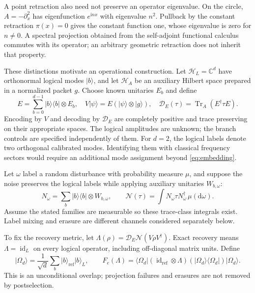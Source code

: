 \documentclass[aip,adv,reprint,onecolumn,amsmath,amssymb]{revtex4-2}
\newcommand{\C}{\mathbb C}
\newcommand{\ii}{\mathrm i}
\newcommand{\dd}{\mathrm d}
\newcommand{\Tr}{\operatorname{Tr}}
\newcommand{\ket}[1]{\lvert #1\rangle}
\newcommand{\bra}[1]{\langle #1\rvert}
\begin{document}
A point retraction also need not preserve an operator eigenvalue. On the circle, $A=-\partial_x^2$ has eigenfunction $e^{\ii nx}$ with eigenvalue $n^2$. Pullback by the constant retraction $\pi(x)=0$ gives the constant function one, whose eigenvalue is zero for $n\ne0$. A spectral projection obtained from the self-adjoint functional calculus commutes with its operator;\cite{reed} an arbitrary geometric retraction does not inherit that property.

These distinctions motivate an operational construction. Let $\mathcal H_L=\C^d$ have orthonormal logical modes $\ket b$, and let $\mathcal H_A$ be an auxiliary Hilbert space prepared in a normalized packet $g$. Choose known unitaries $E_b$ and define
\begin{equation}
 E=\sum_{b=0}^{d-1}\ket b\bra b\otimes E_b,\quad
 V\ket\psi=E(\ket\psi\otimes\ket g),\quad
 \mathcal D_E(\tau)=\Tr_A(E^\dagger\tau E).
 \label{eq:encoder}
\end{equation}
Encoding by $V$ and decoding by $\mathcal D_E$ are completely positive and trace preserving on their appropriate spaces. The logical amplitudes are unknown; the branch controls are specified independently of them. For $d=2$, the logical labels denote two orthogonal calibrated modes. Identifying them with classical frequency sectors would require an additional mode assignment beyond \eqref{eq:embedding}.

Let $\omega$ label a random disturbance with probability measure $\mu$, and suppose the noise preserves the logical labels while applying auxiliary unitaries $W_{b,\omega}$:
\begin{equation}
 N_\omega=\sum_b\ket b\bra b\otimes W_{b,\omega},\qquad
 \mathcal N(\tau)=\int N_\omega\tau N_\omega^\dagger\,\mu(\dd\omega).
 \label{eq:controlled-noise}
\end{equation}
Assume the stated families are measurable so these trace-class integrals exist. Label mixing and erasure are different channels considered separately below.


To fix the recovery metric, let $\Lambda(\rho)=\mathcal D_E\mathcal N(V\rho V^\dagger)$. Exact recovery means $\Lambda=\operatorname{id}_L$ on every logical operator, including off-diagonal matrix units. Define
\begin{equation}
 \ket{\Omega_d}=\frac1{\sqrt d}\sum_b\ket b_{\mathrm{ref}}\ket b_L,
 \qquad F_e(\Lambda)=\bra{\Omega_d}(\operatorname{id}_{\mathrm{ref}}\otimes\Lambda)
 (\ket{\Omega_d}\bra{\Omega_d})\ket{\Omega_d}.
 \label{eq:reference-fidelity}
\end{equation}
This is an unconditional overlap; projection failures and erasures are not removed by postselection.
\end{document}
